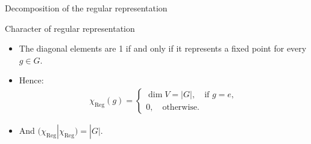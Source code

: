 \documentclass[10pt]{beamer}
\newcommand{\Reg}{\text{Reg}}
\begin{document}
	\begin{frame}{Decomposition of the regular representation}
		\begin{block}{Character of regular representation}
			\begin{itemize}
			
			
			\item The diagonal elements are 1 if and only if it represents a fixed point for every $g \in G$.\pause
			
			
			\item Hence: 
			\begin{align*}
				\chi_\Reg(g) = \begin{cases}
					\dim V = |G|, \quad \text{if $g=e$},\\
					0, \quad \text{otherwise}.
				\end{cases}
			\end{align*}\pause
			
			\item And $(\chi_\Reg|\chi_\Reg) = |G|$.
			
			
		\end{itemize}
		\end{block}
%		
	\end{frame}
\end{document}
